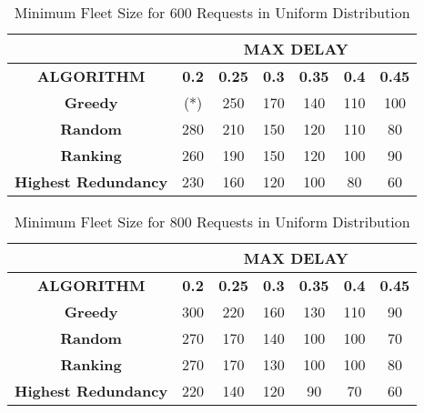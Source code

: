 \documentclass[urop]{socreport}
\begin{document}
\begin{table}[h!]
    \centering
    \begin{tabular}{|c|c|c|c|c|c|c|}
        \hline
         & \multicolumn{6}{|c|}{\textbf{MAX DELAY}}\\
         \hline
         \textbf{ALGORITHM} & \textbf{0.2} & \textbf{0.25}& \textbf{0.3}& \textbf{0.35}& \textbf{0.4}& \textbf{0.45}\\
         \hline \hline
         \textbf{Greedy} & (*) & 250 & 170 & 140 & 110 & 100\\
         \hline
         \textbf{Random} & 280 & 210 & 150 & 120 & 110 & 80 \\
         \hline
         \textbf{Ranking} & 260 & 190 & 150 & 120 & 100 & 90 \\
         \hline
         \textbf{Highest Redundancy} & 230 & 160 & 120 & 100 & 80 & 60 \\
        \hline
    \end{tabular}
    \caption{Minimum Fleet Size for 600 Requests in Uniform Distribution}
    \label{tab:exp1_600}
\end{table}

\begin{table}[h!]
    \centering
    \begin{tabular}{|c|c|c|c|c|c|c|}
        \hline
         & \multicolumn{6}{|c|}{\textbf{MAX DELAY}}\\
         \hline
         \textbf{ALGORITHM} & \textbf{0.2} & \textbf{0.25}& \textbf{0.3}& \textbf{0.35}& \textbf{0.4}& \textbf{0.45}\\
         \hline \hline
         \textbf{Greedy} & 300 & 220 & 160 & 130 & 110 & 90\\
         \hline
         \textbf{Random} & 270 & 170 & 140 & 100 & 100 & 70 \\
         \hline
         \textbf{Ranking} & 270 & 170 & 130 & 100 & 100 & 80 \\
         \hline
         \textbf{Highest Redundancy} & 220 & 140 & 120 & 90 & 70 & 60 \\
        \hline
    \end{tabular}
    \caption{Minimum Fleet Size for 800 Requests in Uniform Distribution}
    \label{tab:exp1_800}
\end{table}
\end{document}
